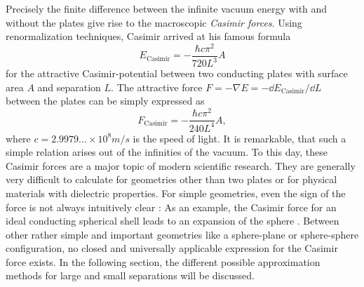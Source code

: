 Precisely the finite difference between the infinite vacuum energy with and without the plates give rise to the macroscopic \emph{Casimir forces}.
Using renormalization techniques, Casimir arrived at his famous formula \cite{Casimir_1948}
\begin{equation}\label{eq:3:casimir-energy-pp-conducting}
  E_\mathrm{Casimir} = -\frac{\hbar c \pi^2}{720 L^3} A
\end{equation}
for the attractive Casimir-potential between two conducting plates with surface area $A$ and separation $L$.
The attractive force $F=-\nabla E = -\dd E_\mathrm{Casimir} / \dd L$ between the plates can be simply expressed as
\begin{equation}\label{eq:3:casimir-force-pp-conducting}
  F_\mathrm{Casimir} = - \frac{\hbar c \pi^2}{240 L^4} A ,
\end{equation}
where $c=2.9979...\times 10^{8}\si{m/s}$ is the speed of light.
It is remarkable, that such a simple relation arises out of the infinities of the vacuum.
To this day, these Casimir forces are a major topic of modern scientific research. They are generally very difficult to calculate for geometries other than two plates or for physical materials with dielectric properties. 
For simple geometries, even the sign of the force is not always intuitively clear \cite{Klimchitskaya_2009}: As an example, the Casimir force for an ideal conducting spherical shell leads to an expansion of the sphere \cite{Boyer_1968}.
Between other rather simple and important geometries like a sphere-plane or sphere-sphere configuration, no closed and universally applicable expression for the Casimir force exists.
In the following section, the different possible approximation methods for large and small separations will be discussed.

